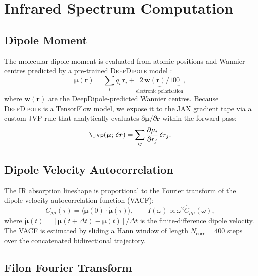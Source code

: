 \documentclass{article}
\begin{document}
\section{Infrared Spectrum Computation}
\label{sec:ir}

\subsection{Dipole Moment}
\label{sec:dipole}

The molecular dipole moment is evaluated from atomic positions and Wannier
centres predicted by a pre-trained \textsc{DeepDipole} model \cite{deepdipole}:
\begin{equation}
  \bm{\mu}(\bm{r}) = \sum_i q_i\,\bm{r}_i
    + \underbrace{2\,\bm{w}(\bm{r})/100}_{\text{electronic polarisation}},
\end{equation}
where $\bm{w}(\bm{r})$ are the DeepDipole-predicted Wannier centres.  Because
\textsc{DeepDipole} is a TensorFlow model, we expose it to the JAX gradient
tape via a custom JVP rule that analytically evaluates
$\partial\bm{\mu}/\partial\bm{r}$ within the forward pass:
\begin{equation}
  \jvp(\bm{\mu};\,\delta\bm{r})
    = \sum_{ij} \frac{\partial \mu_i}{\partial r_j}\,\delta r_j.
\end{equation}

\subsection{Dipole Velocity Autocorrelation}

The IR absorption lineshape is proportional to the Fourier transform of the
dipole velocity autocorrelation function (VACF):
\begin{equation}
  \label{eq:vacf}
  C_{\dot{\mu}\dot{\mu}}(\tau)
    = \langle \dot{\bm{\mu}}(0) \cdot \dot{\bm{\mu}}(\tau) \rangle,
  \qquad
  I(\omega) \propto \omega^2 \hat{C}_{\dot{\mu}\dot{\mu}}(\omega),
\end{equation}
where $\dot{\bm{\mu}}(t) = [\bm{\mu}(t+\Delta t) - \bm{\mu}(t)]/\Delta t$
is the finite-difference dipole velocity.  The VACF is estimated by sliding
a Hann window of length $N_\mathrm{corr} = 400$ steps over the concatenated
bidirectional trajectory.

\subsection{Filon Fourier Transform}
\end{document}
